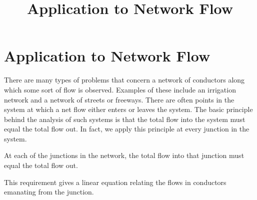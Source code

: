 \documentclass{ximera}
\title{Application to Network Flow} \license{CC BY-NC-SA 4.0}
\begin{document}
\begin{abstract}
\end{abstract}
\maketitle

\section*{Application to Network Flow}
There are many types of problems that concern a network of conductors along which some sort of flow is observed. Examples of these include an irrigation network and a network of streets or freeways. There are often points in the system at which a net flow either enters or leaves the system. The basic principle behind the analysis of such systems is that the total flow into the system must equal the total flow out. In fact, we apply this principle at every junction in the system.

\begin{theorem}\label{001735}
At each of the junctions in the network, the total flow into that junction must equal the total flow out.
\end{theorem}

\noindent This requirement gives a linear equation relating the flows in conductors emanating from the junction.
\end{document}
